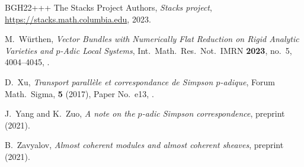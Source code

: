 \begin{thebibliography}{BGH{\etalchar{+}}22+++}
The Stacks Project Authors, \emph{Stacks project}, \url{https://stacks.math.columbia.edu}, 2023. 
	
M.~W\"{u}rthen, 
{\em {V}ector {B}undles with {N}umerically {F}lat {R}eduction on {R}igid {A}nalytic {V}arieties and $p$-{A}dic {L}ocal {S}ystems}, Int.\ Math.\ Res.\ Not.\  IMRN \textbf{2023}, no.~5, 4004--4045, .
	
D.~Xu, 
{\em Transport parall\`ele et correspondance de {S}impson {$p$}-adique}, Forum Math.\ Sigma,  \textbf{5} (2017), Paper No.~e13, .
	
J.~Yang and  K.~Zuo,
{\em A note on the $p$-adic {S}impson correspondence}, preprint  (2021).
	
B.~Zavyalov, 
{\em Almost coherent modules and almost coherent sheaves}, preprint  (2021).
	
\end{thebibliography}
